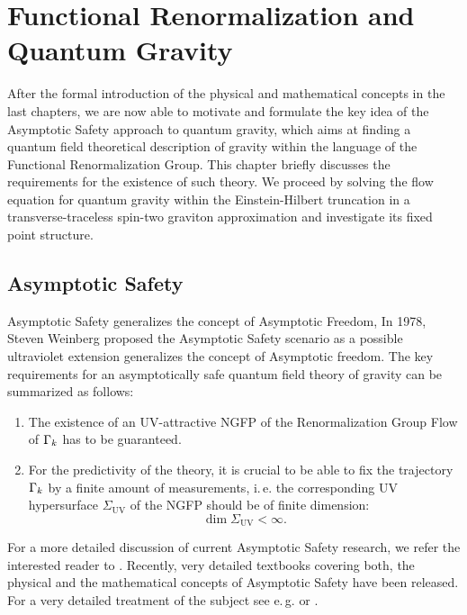 \chapter{Functional Renormalization and Quantum Gravity}\label{chap:EHT}
After the formal introduction of the physical and mathematical concepts in the last chapters, we are now able to motivate and formulate the key idea of the Asymptotic Safety approach to quantum gravity, which aims at finding a quantum field theoretical description of gravity within the language of the Functional Renormalization Group. This chapter briefly discusses the requirements for the existence of such theory. We proceed by solving the flow equation for quantum gravity within the Einstein-Hilbert truncation in a transverse-traceless spin-two graviton approximation and investigate its fixed point structure. 
\section{Asymptotic Safety}
Asymptotic Safety generalizes the concept of Asymptotic Freedom,
In 1978, Steven Weinberg proposed the Asymptotic Safety scenario as a possible ultraviolet extension \cite{Weinberg1980}
 generalizes the concept of Asymptotic freedom. The key requirements for an asymptotically safe quantum field theory of gravity can be summarized as follows: 
\begin{enumerate}
	\item The existence of an UV-attractive NGFP of the Renormalization Group Flow of $\Gamma_{k}$ has to be guaranteed. 
	
	\item For the predictivity of the theory, it is crucial to be able to fix the trajectory $\Gamma_{k}$ by a finite amount of measurements, i.\,e. the corresponding UV hypersurface $\Sigma_{\mathrm{UV}}$ of the NGFP should be of finite dimension: 
	\begin{equation*}
		\operatorname{dim}\Sigma_{\mathrm{UV}} < \infty.
	\end{equation*} 
\end{enumerate} 


For a more detailed discussion of current Asymptotic Safety research, we refer the interested reader to \cite{Eichhorn2018}. Recently, very detailed textbooks covering both, the physical and the mathematical concepts of Asymptotic Safety have been released. For a very detailed treatment of the subject see e.\,g. \cite{Percacci2017} or \cite{ReuterSaueressig_2019}.
